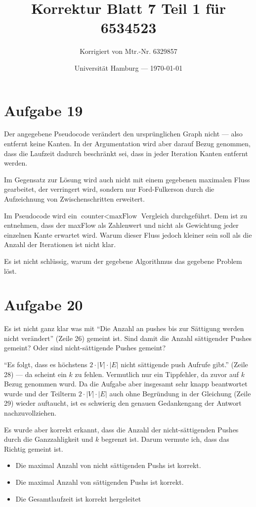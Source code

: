 \documentclass[parskip=half,a4paper]{scrartcl}
\title{Korrektur Blatt 7 Teil 1 für 6534523}
\author{Korrigiert von Mtr.-Nr. 6329857}
\date{Universität Hamburg --- \today}
\begin{document}
\maketitle %



\section{Aufgabe 19}

Der angegebene Pseudocode verändert den ursprünglichen Graph nicht --- also entfernt keine Kanten. In der Argumentation wird aber darauf Bezug genommen, dass die Laufzeit dadurch beschränkt sei, dass in jeder Iteration Kanten entfernt werden.

Im Gegensatz zur Lösung wird auch nicht mit einem gegebenen maximalen Fluss gearbeitet, der verringert wird, sondern nur Ford-Fulkerson durch die Aufzeichnung von Zwischenschritten erweitert.

Im Pseudocode wird ein $\text{counter} < \text{maxFlow}$ Vergleich durchgeführt. Dem ist zu entnehmen, dass der maxFlow als Zahlenwert und nicht als Gewichtung jeder einzelnen Kante erwartet wird. Warum dieser Fluss jedoch kleiner sein soll als die Anzahl der Iterationen ist nicht klar.

Es ist nicht schlüssig, warum der gegebene Algorithmus das gegebene Problem löst.

\section{Aufgabe 20}

Es ist nicht ganz klar was mit \enquote{Die Anzahl an pushes bis zur Sättigung werden nicht verändert} (Zeile 26) gemeint ist. Sind damit die Anzahl sättigender Pushes gemeint? Oder sind nicht-sättigende Pushes gemeint?

\enquote{Es folgt, dass es höchstens $2\cdot|V|\cdot|E|$ nicht sättigende push Aufrufe gibt.} (Zeile 28) --- da scheint ein $k$ zu fehlen. Vermutlich nur ein Tippfehler, da zuvor auf $k$ Bezug genommen wurd. Da die Aufgabe aber insgesamt sehr knapp beantwortet wurde und der Teilterm $2\cdot|V|\cdot|E|$ auch ohne Begründung in der Gleichung (Zeile 29) wieder auftaucht, ist es schwierig den genauen Gedankengang der Antwort nachzuvollziehen.

Es wurde aber korrekt erkannt, dass die Anzahl der nicht-sättigenden Pushes durch die Ganzzahligkeit und $k$ begrenzt ist. Darum vermute ich, dass das Richtig gemeint ist.

\begin{itemize}
    \item Die maximal Anzahl von nicht sättigenden Pushs ist korrekt.
    \item Die maximal Anzahl von sättigenden Pushs ist korrekt.
    \item Die Gesamtlaufzeit ist korrekt hergeleitet
\end{itemize}
\end{document}
